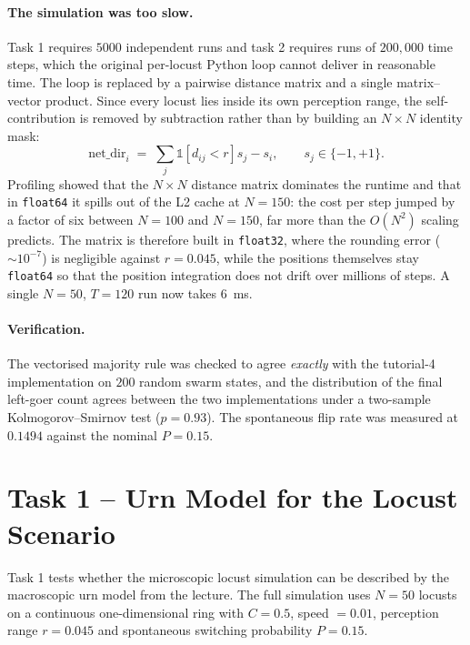 \documentclass[12pt, a4paper]{article}
\begin{document}
\paragraph{The simulation was too slow.}
Task 1 requires $5000$ independent runs and task 2 requires runs of $200{,}000$
time steps, which the original per-locust Python loop cannot deliver in
reasonable time.  The loop is replaced by a pairwise distance matrix and a
single matrix--vector product.  Since every locust lies inside its own
perception range, the self-contribution is removed by subtraction rather than by
building an $N \times N$ identity mask:
\[
    \text{net\_dir}_i \;=\; \sum_{j} \mathbb{1}\!\left[d_{ij} < r\right] s_j - s_i ,
    \qquad s_j \in \{-1, +1\}.
\]
Profiling showed that the $N \times N$ distance matrix dominates the runtime and
that in \texttt{float64} it spills out of the L2 cache at $N = 150$: the cost per
step jumped by a factor of six between $N = 100$ and $N = 150$, far more than the
$O(N^2)$ scaling predicts.  The matrix is therefore built in \texttt{float32},
where the rounding error ($\sim 10^{-7}$) is negligible against $r = 0.045$,
while the positions themselves stay \texttt{float64} so that the position
integration does not drift over millions of steps.  A single $N = 50$, $T = 120$
run now takes $6$~ms.

\paragraph{Verification.}
The vectorised majority rule was checked to agree \emph{exactly} with the
tutorial-4 implementation on $200$ random swarm states, and the distribution of
the final left-goer count agrees between the two implementations under a
two-sample Kolmogorov--Smirnov test ($p = 0.93$).  The spontaneous flip rate was
measured at $0.1494$ against the nominal $P = 0.15$.

\newpage
\section{Task 1 -- Urn Model for the Locust Scenario}

Task 1 tests whether the microscopic locust simulation can be described by the
macroscopic urn model from the lecture.  The full simulation uses $N = 50$
locusts on a continuous one-dimensional ring with $C = 0.5$, speed $= 0.01$,
perception range $r = 0.045$ and spontaneous switching probability $P = 0.15$.
\end{document}
